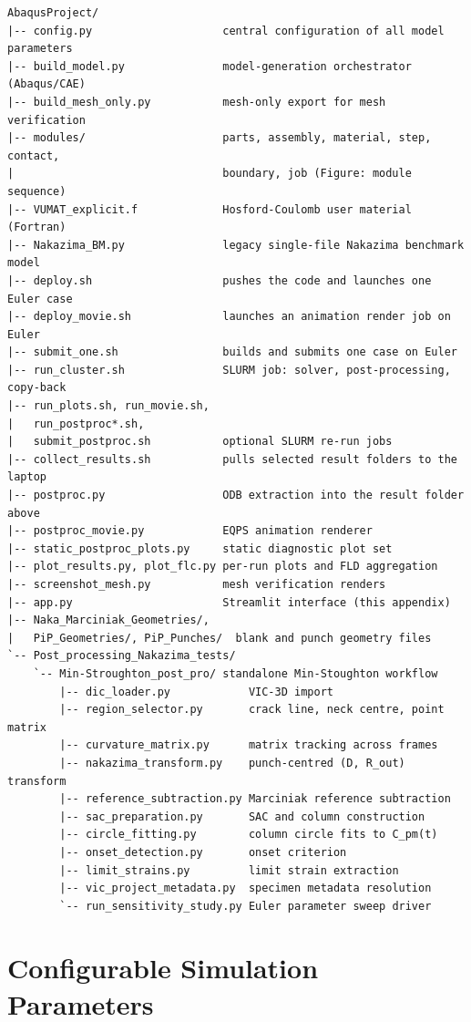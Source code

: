 \begin{lstlisting}[frame=lines,basicstyle=\ttfamily\scriptsize]
AbaqusProject/
|-- config.py                    central configuration of all model parameters
|-- build_model.py               model-generation orchestrator (Abaqus/CAE)
|-- build_mesh_only.py           mesh-only export for mesh verification
|-- modules/                     parts, assembly, material, step, contact,
|                                boundary, job (Figure: module sequence)
|-- VUMAT_explicit.f             Hosford-Coulomb user material (Fortran)
|-- Nakazima_BM.py               legacy single-file Nakazima benchmark model
|-- deploy.sh                    pushes the code and launches one Euler case
|-- deploy_movie.sh              launches an animation render job on Euler
|-- submit_one.sh                builds and submits one case on Euler
|-- run_cluster.sh               SLURM job: solver, post-processing, copy-back
|-- run_plots.sh, run_movie.sh,
|   run_postproc*.sh,
|   submit_postproc.sh           optional SLURM re-run jobs
|-- collect_results.sh           pulls selected result folders to the laptop
|-- postproc.py                  ODB extraction into the result folder above
|-- postproc_movie.py            EQPS animation renderer
|-- static_postproc_plots.py     static diagnostic plot set
|-- plot_results.py, plot_flc.py per-run plots and FLD aggregation
|-- screenshot_mesh.py           mesh verification renders
|-- app.py                       Streamlit interface (this appendix)
|-- Naka_Marciniak_Geometries/,
|   PiP_Geometries/, PiP_Punches/  blank and punch geometry files
`-- Post_processing_Nakazima_tests/
    `-- Min-Stroughton_post_pro/ standalone Min-Stoughton workflow
        |-- dic_loader.py            VIC-3D import
        |-- region_selector.py       crack line, neck centre, point matrix
        |-- curvature_matrix.py      matrix tracking across frames
        |-- nakazima_transform.py    punch-centred (D, R_out) transform
        |-- reference_subtraction.py Marciniak reference subtraction
        |-- sac_preparation.py       SAC and column construction
        |-- circle_fitting.py        column circle fits to C_pm(t)
        |-- onset_detection.py       onset criterion
        |-- limit_strains.py         limit strain extraction
        |-- vic_project_metadata.py  specimen metadata resolution
        `-- run_sensitivity_study.py Euler parameter sweep driver
\end{lstlisting}

\section{Configurable Simulation Parameters}
\label{app:configuration_parameters}

